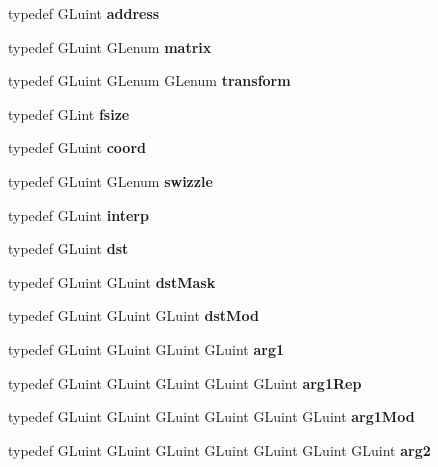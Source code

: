 \begin{DoxyCompactItemize}
\item 
typedef G\+Luint {\bfseries address}\label{_s_d_l__opengl_8h_a86e3d190561a4ae1e195e1a2bcc83db5}

\item 
typedef G\+Luint G\+Lenum {\bfseries matrix}\label{_s_d_l__opengl_8h_a7b24a3f2f56eb1244ae69dacb4fecb6f}

\item 
typedef G\+Luint G\+Lenum G\+Lenum {\bfseries transform}\label{_s_d_l__opengl_8h_a07993c0d92c1aeeb357ba0495c8b5325}

\item 
typedef G\+Lint {\bfseries fsize}\label{_s_d_l__opengl_8h_af920e4f35bb93c40a9b337d6ad5378b8}

\item 
typedef G\+Luint {\bfseries coord}\label{_s_d_l__opengl_8h_a4ad6f000813afde2b5727cbfdddc75be}

\item 
typedef G\+Luint G\+Lenum {\bfseries swizzle}\label{_s_d_l__opengl_8h_a320af4389dfb5556a1049053d79f8ec5}

\item 
typedef G\+Luint {\bfseries interp}\label{_s_d_l__opengl_8h_a8df6d532843e6b3c43d14798522b9f44}

\item 
typedef G\+Luint {\bfseries dst}\label{_s_d_l__opengl_8h_a92034251bfd455d524a9b5610cddba00}

\item 
typedef G\+Luint G\+Luint {\bfseries dst\+Mask}\label{_s_d_l__opengl_8h_a194b4a6b2c39e66f279c98ce63946846}

\item 
typedef G\+Luint G\+Luint G\+Luint {\bfseries dst\+Mod}\label{_s_d_l__opengl_8h_afcd7b5ae4d6e78ff51977e23c0e8084c}

\item 
typedef G\+Luint G\+Luint G\+Luint G\+Luint {\bfseries arg1}\label{_s_d_l__opengl_8h_a4b247ab422408c1761a36f9034c2585b}

\item 
typedef G\+Luint G\+Luint G\+Luint G\+Luint G\+Luint {\bfseries arg1\+Rep}\label{_s_d_l__opengl_8h_a23955e5e637582f309872077096f1be2}

\item 
typedef G\+Luint G\+Luint G\+Luint G\+Luint G\+Luint G\+Luint {\bfseries arg1\+Mod}\label{_s_d_l__opengl_8h_a101460b65b01480715a6d7cacfb50015}

\item 
typedef G\+Luint G\+Luint G\+Luint G\+Luint G\+Luint G\+Luint G\+Luint {\bfseries arg2}\label{_s_d_l__opengl_8h_a5aee5a44bf92a9837fea48e41ef0df57}


\end{DoxyCompactItemize}
